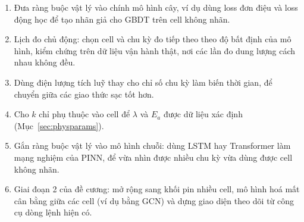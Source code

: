 \documentclass[12pt,a4paper,oneside]{report}
\theoremstyle{plain}
\theoremstyle{definition}
\begin{document}
\begin{enumerate}
\item Đưa ràng buộc vật lý vào chính mô hình cây, ví dụ dùng loss đơn điệu và loss động học để tạo nhãn giả cho
      GBDT trên cell không nhãn.
\item Lịch đo chủ động: chọn cell và chu kỳ đo tiếp theo theo độ bất định của mô hình, kiểm chứng trên dữ liệu vận hành thật, nơi các lần đo dung lượng cách nhau không đều.
\item Dùng điện lượng tích luỹ thay cho chỉ số chu kỳ làm biến thời gian, để chuyển giữa các giao thức sạc tốt hơn.
\item Cho $k$ chỉ phụ thuộc vào cell để $\lambda$ và $E_a$ được dữ liệu xác định (Mục~\ref{sec:physparams}).
\item Gắn ràng buộc vật lý vào mô hình chuỗi: dùng LSTM hay Transformer làm mạng nghiệm của PINN, để vừa nhìn được nhiều chu kỳ vừa dùng được cell không nhãn.
\item Giai đoạn 2 của đề cương: mở rộng sang khối pin nhiều cell, mô hình hoá mất cân bằng giữa các cell (ví dụ
      bằng GCN) và dựng giao diện theo dõi từ công cụ dòng lệnh hiện có.
\end{enumerate}
\end{document}
